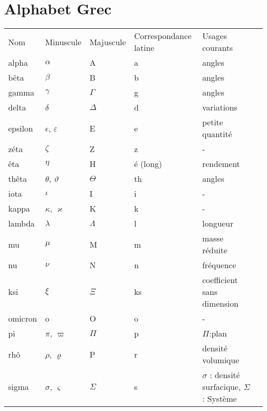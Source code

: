 \addappheadtotoc

\chapter{Alphabet Grec\label{annexe-alpha_grec}}


\begin{table}[!h]
\centering
\begin{tabular}{M{1.75cm}M{1.75cm}M{1.75cm}M{3.75cm}M{3.75cm}N}
    \hhline{=====}
    Nom & Minuscule & Majuscule & Correspondance latine & Usages courants &\\[2em]
    \hhline{=====}
    alpha & $\alpha$ & A & a & angles & \\[0.5em]
    \hline
    bêta  & $\beta$  & B  & b & angles & \\[0.5em]
    \hline
    gamma & $\gamma$ & $\Gamma$ & g & angles & \\[0.5em]
    \hline
    delta & $\delta$ & $\Delta$ & d & variations & \\[0.5em]
    \hline
    epsilon & $\epsilon$, $\varepsilon$ & E & e & petite quantité & \\[0.5em]
    \hline
    zéta & $\zeta$ & Z & z & -  & \\[0.5em]
    \hline
    êta & $\eta$ & H & é (long) & rendement & \\[0.5em]
    \hline
    thêta & $\theta$, $\vartheta$  & $\Theta$ & th & angles & \\[0.5em]
    \hline
    iota & $\iota$ & I & i & - & \\[0.5em]
    \hline
    kappa & $\kappa$, $\varkappa$ & K & k & - & \\[0.5em]
    \hline
    lambda & $\lambda$ & $\Lambda$ & l & longueur & \\[0.5em]
    \hline
    mu & $\mu$ & M & m & masse réduite & \\[0.5em]
    \hline
    nu & $\nu$ & N & n & fréquence & \\[0.5em]
    \hline
    ksi & $\xi$ & $\Xi$ & ks & coefficient sans dimension & \\[0.5em]
    \hline
    omicron & o & O & o & - & \\[0.5em]
    \hline
    pi & $\pi$, $\varpi$ & $\Pi$ & p & $\Pi$:plan & \\[0.5em]
    \hline
    rhô & $\rho$, $\varrho$ & P & r & densité volumique & \\[0.5em]
    \hline
    sigma & $\sigma$, $\varsigma$ & $\Sigma$ & s & $\sigma$ : densité surfacique, $\Sigma$ : Système  & \\[0.5em]

\end{tabular}
\end{table}
